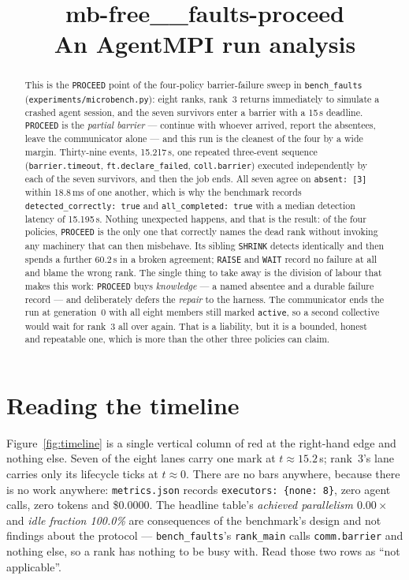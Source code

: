 \documentclass[11pt]{article}
\title{\textbf{mb-free\_\_faults-proceed}\\[2pt]\large An AgentMPI run analysis}
\author{}
\date{}
\begin{document}
\maketitle

\begin{abstract}
This is the \texttt{PROCEED} point of the four-policy barrier-failure sweep in
\texttt{bench\_faults} (\texttt{experiments/microbench.py}): eight ranks, rank~3 returns
immediately to simulate a crashed agent session, and the seven survivors enter a barrier
with a 15\,s deadline. \texttt{PROCEED} is the \emph{partial barrier} --- continue with
whoever arrived, report the absentees, leave the communicator alone --- and this run is
the cleanest of the four by a wide margin. Thirty-nine events, 15.217\,s, one repeated
three-event sequence (\texttt{barrier.timeout}, \texttt{ft.declare\_failed},
\texttt{coll.barrier}) executed independently by each of the seven survivors, and then
the job ends. All seven agree on \texttt{absent:\ [3]} within 18.8\,ms of one another,
which is why the benchmark records \texttt{detected\_correctly:\ true} and
\texttt{all\_completed:\ true} with a median detection latency of 15.195\,s. Nothing
unexpected happens, and that is the result: of the four policies, \texttt{PROCEED} is the
only one that correctly names the dead rank without invoking any machinery that can then
misbehave. Its sibling \texttt{SHRINK} detects identically and then spends a further
60.2\,s in a broken agreement; \texttt{RAISE} and \texttt{WAIT} record no failure at all
and blame the wrong rank. The single thing to take away is the division of labour that
makes this work: \texttt{PROCEED} buys \emph{knowledge} --- a named absentee and a durable
failure record --- and deliberately defers the \emph{repair} to the harness. The
communicator ends the run at generation~0 with all eight members still marked
\texttt{active}, so a second collective would wait for rank~3 all over again. That is a
liability, but it is a bounded, honest and repeatable one, which is more than the other
three policies can claim.
\end{abstract}



\section{Reading the timeline}

Figure~\ref{fig:timeline} is a single vertical column of red at the right-hand edge and
nothing else. Seven of the eight lanes carry one mark at $t\approx15.2$\,s; rank~3's lane
carries only its lifecycle ticks at $t\approx0$. There are no bars anywhere, because there
is no work anywhere: \texttt{metrics.json} records \texttt{executors:\ \{none: 8\}}, zero
agent calls, zero tokens and \$0.0000. The headline table's \emph{achieved parallelism
$0.00\times$} and \emph{idle fraction 100.0\%} are consequences of the benchmark's design
and not findings about the protocol --- \texttt{bench\_faults}'s \texttt{rank\_main} calls
\texttt{comm.barrier} and nothing else, so a rank has nothing to be busy with. Read those
two rows as ``not applicable''.
\end{document}
